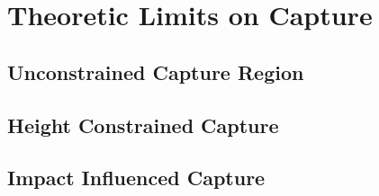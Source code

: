 %
\chapter{Theoretic Limits on Capture}

\section{Unconstrained Capture Region}

\section{Height Constrained Capture}

\section{Impact Influenced Capture}

